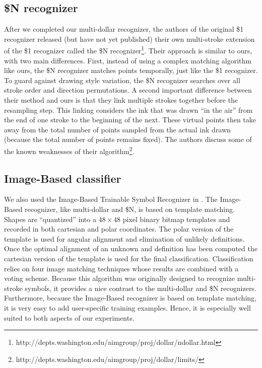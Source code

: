 \documentclass[final,5p,twocolumn]{elsarticle}
\begin{document}
\subsection{\$N recognizer}
After we completed our multi-dollar recognizer, the authors of the original \$1
recognizer released (but have not yet published) their own 
multi-stroke extension of the \$1 recognizer called the \$N
recognizer\footnote{http://depts.washington.edu/aimgroup/proj/dollar/ndollar.html}.
Their approach is similar to ours, with two main differences.
First, instead of using a complex matching algorithm like ours, 
the \$N recognizer matches points temporally, just like the \$1 recognizer.
To guard against drawing style variation, the \$N recognizer searches over 
all stroke order and direction permutations.  A second important difference
between their method and ours is that they link multiple strokes together
before the resampling step.  This linking considers the ink that was drawn
``in the air'' from the end of one stroke to the beginning of the next.  These
virtual points then take away from the total number of points sampled from
the actual ink drawn (because the total number of points remains fixed). 
The authors discuss some of the known weaknesses of their algorithm\footnote{http://depts.washington.edu/aimgroup/proj/dollar/limits/}.

\subsection{Image-Based classifier}
We also used the Image-Based Trainable Symbol
Recognizer in \cite{kara05}.  The Image-Based recognizer,
like multi-dollar and \$N, is based on template matching.
Shapes are ``quantized'' into a $48\times 48$ pixel binary bitmap templates
and recorded in both cartesian and polar coordinates.  The polar version
of the template is used for angular alignment and elimination of unlikely definitions.
Once the optimal alignment of an unknown and definition has been computed
the cartesian version of the template is used for the final classification.
Classification relies on four image matching techniques whose
results are combined with a voting scheme. 
Because this algorithm was originally designed to recognize multi-stroke symbols,
it provides a nice contrast to the multi-dollar and \$N recognizers.
Furthermore, because the Image-Based recognizer is based on template matching,
it is very easy to add user-specific training examples.  Hence, it is especially
well suited to both aspects of our experiments.
\end{document}
